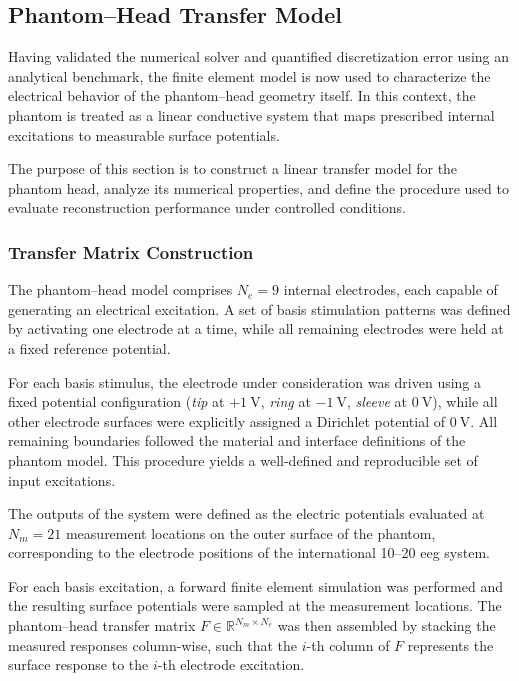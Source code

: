 \subsection{Phantom--Head Transfer Model}

Having validated the numerical solver and quantified discretization error using an analytical benchmark, the finite element model is now used to characterize the electrical behavior of the phantom--head geometry itself. In this context, the phantom is treated as a linear conductive system that maps prescribed internal excitations to measurable surface potentials.

The purpose of this section is to construct a linear transfer model for the phantom head, analyze its numerical properties, and define the procedure used to evaluate reconstruction performance under controlled conditions.

\subsubsection{Transfer Matrix Construction}

The phantom--head model comprises $N_e = 9$ internal electrodes, each capable of generating an electrical excitation. A set of basis stimulation patterns was defined by activating one electrode at a time, while all remaining electrodes were held at a fixed reference potential.

For each basis stimulus, the electrode under consideration was driven using a fixed potential configuration (\textit{tip} at $+1~\mathrm{V}$, \textit{ring} at $-1~\mathrm{V}$, \textit{sleeve} at $0~\mathrm{V}$), while all other electrode surfaces were explicitly assigned a Dirichlet potential of $0~\mathrm{V}$. All remaining boundaries followed the material and interface definitions of the phantom model. This procedure yields a well-defined and reproducible set of input excitations.

The outputs of the system were defined as the electric potentials evaluated at $N_m = 21$ measurement locations on the outer surface of the phantom, corresponding to the electrode positions of the international 10--20 \gls{eeg} system.

For each basis excitation, a forward finite element simulation was performed and the resulting surface potentials were sampled at the measurement locations. The phantom--head transfer matrix $F \in \mathbb{R}^{N_m \times N_e}$ was then assembled by stacking the measured responses column-wise, such that the $i$-th column of $F$ represents the surface response to the $i$-th electrode excitation.


